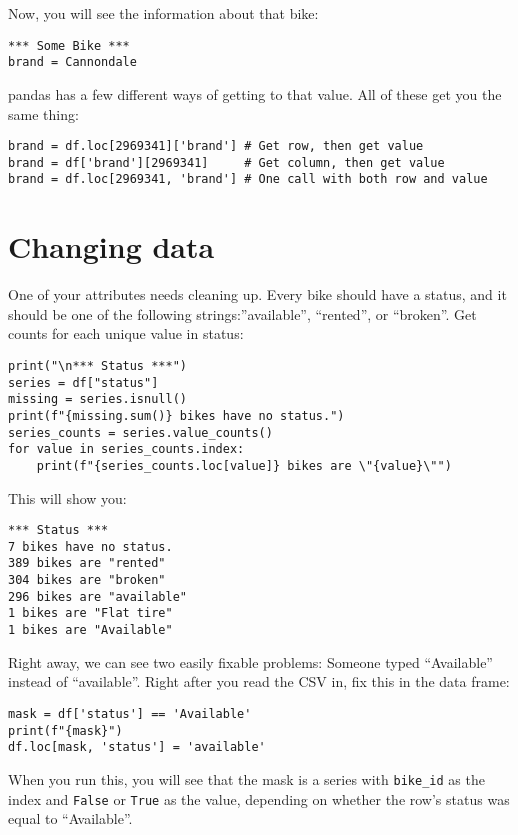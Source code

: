 Now, you will see the information about that bike:

\begin{Verbatim}
*** Some Bike ***
brand = Cannondale
\end{Verbatim}

pandas has a few different ways of getting to that value.  All of these get you the same thing:
\begin{Verbatim}
brand = df.loc[2969341]['brand'] # Get row, then get value
brand = df['brand'][2969341]     # Get column, then get value
brand = df.loc[2969341, 'brand'] # One call with both row and value
\end{Verbatim}

\section{Changing data}

One of your attributes needs cleaning up. Every bike should have a
status, and it should be one of the following strings:''available'',
``rented'', or ``broken''.  Get counts for each unique value in
status:

\begin{Verbatim}
print("\n*** Status ***")
series = df["status"]
missing = series.isnull()
print(f"{missing.sum()} bikes have no status.")
series_counts = series.value_counts()
for value in series_counts.index:
    print(f"{series_counts.loc[value]} bikes are \"{value}\"")
\end{Verbatim}

This will show you:

\begin{Verbatim}
*** Status ***
7 bikes have no status.
389 bikes are "rented"
304 bikes are "broken"
296 bikes are "available"
1 bikes are "Flat tire"
1 bikes are "Available"
\end{Verbatim}

Right away, we can see two easily fixable problems: Someone typed
``Available'' instead of ``available''.  Right after you read the CSV
in, fix this in the data frame:

\begin{Verbatim}
mask = df['status'] == 'Available'
print(f"{mask}")
df.loc[mask, 'status'] = 'available'
\end{Verbatim}

When you run this, you will see that the mask is a series with
\texttt{bike\_id} as the index and \texttt{False} or \texttt{True} as the value,
depending on whether the row's status was equal to ``Available''.

